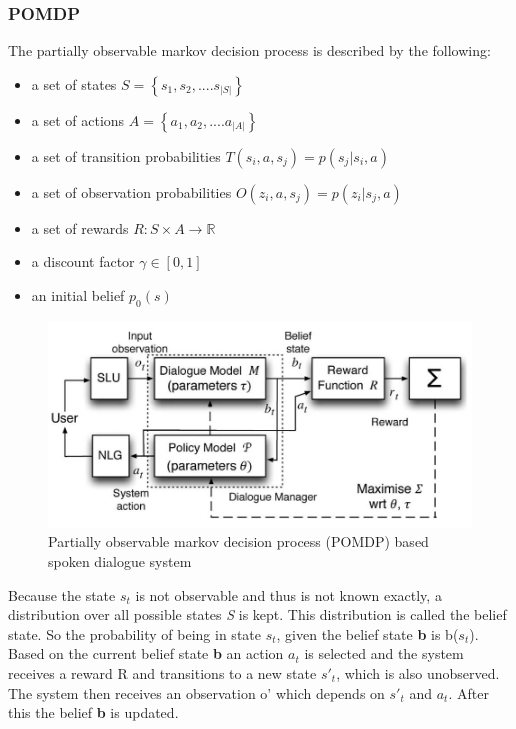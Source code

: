 \documentclass[conference]{IEEEtran}
\begin{document}
\subsubsection{POMDP}
The partially observable markov decision process is described by the following:
\begin{itemize}
\item{a set of states $S=\left \{ s_{1},s_{2},....s_{|S|}  \right \}$}
\item{a set of actions $A=\left \{ a_{1},a_{2},....a_{|A|}  \right \}$}
\item{a set of transition probabilities $T(s_{i},a,s_{j})=p(s_{j}|s_{i},a)$}
\item{a set of observation probabilities $O(z_{i},a,s_{j})=p(z_{i}|s_{j},a)$}
\item{a set of rewards $R:S\times A\rightarrow \mathbb{R}$}
\item{a discount factor $\gamma \in \left [ 0,1 \right ]$}
\item{an initial belief $p_{0}(s)$}
\end{itemize}

\begin{figure}[H]
\centering
   \includegraphics[width=\linewidth]{pomdp.jpg}
  \caption{Partially observable markov decision process (POMDP) based spoken dialogue system\cite{young2013pomdp} }
  \label{fig:pomdp}
\end{figure}


Because the state $s_{t}$ is not observable and thus is not known exactly, a distribution over all possible states \emph{S} is kept. This distribution is called the belief state. So the probability of being in state $s_{t}$, given the belief state \textbf{b} is b($s_{t}$)\cite{young2007hidden}. 
Based on the current belief state \textbf{b} an action $a_{t}$ is selected and the system receives  a reward R and transitions to a new state $s'_{t}$, which is also unobserved. The system then receives an observation o' which depends on $s'_{t}$ and $a_{t}$. After this the belief \textbf{b} is updated\cite{young2007hidden,young2013pomdp}.
\end{document}
